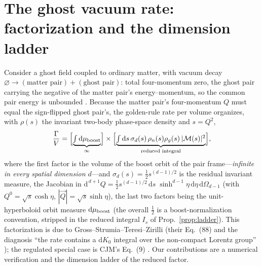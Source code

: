 \documentclass[11pt]{article}
\theoremstyle{definition}
\theoremstyle{remark}
\newcommand{\dd}{\mathrm{d}}
\begin{document}
\section{The ghost vacuum rate: factorization and the dimension
ladder}
\label{sec:factorization}

Consider a ghost field coupled to ordinary matter, with vacuum decay
$\varnothing\to(\text{matter pair})+(\text{ghost pair})$: total
four-momentum zero, the ghost pair carrying the negative of the
matter pair's energy--momentum, so the common pair energy is
unbounded \cite{CHT2003,CJM2004}. Because the matter pair's
four-momentum $Q$ must equal the sign-flipped ghost pair's, the
golden-rule rate per volume organizes, with $\rho(s)$ the invariant
two-body phase-space density and $s=Q^2$,
\begin{equation}
\frac{\Gamma}{V}
=\Bigl[\underbrace{\textstyle\int \dd\mu_{\rm boost}}_{\infty}\Bigr]
\times
\Bigl[\underbrace{\textstyle\int \dd s\,
\sigma_d(s)\,\rho_n(s)\rho_g(s)\,|\mathcal M(s)|^{2}}_{\text{reduced
integral}}\Bigr],
\label{eq:factorization}
\end{equation}
where the first factor is the volume of the boost orbit of the pair
frame---\emph{infinite in every spatial dimension $d$}---and
$\sigma_d(s)=\tfrac12 s^{(d-1)/2}$ is the residual invariant measure,
the Jacobian in
$\dd^{\,d+1}Q=\tfrac12 s^{(d-1)/2}\,\dd s\;\sinh^{d-1}\!\eta\,\dd\eta\,
\dd\Omega_{d-1}$ (with $Q^0=\sqrt s\cosh\eta$,
$|\vec Q|=\sqrt s\sinh\eta$), the last two factors being the
unit-hyperboloid orbit measure $\dd\mu_{\rm boost}$ (the overall
$\tfrac12$ is a boost-normalization convention, stripped in the
reduced integral $I_s$ of Prop.~\ref{prop:ladder}). This factorization
is due to Gross--Strumia--Teresi--Zirilli (their Eq.~(88) and the
diagnosis ``the rate contains a $\dd K_0$ integral over the
non-compact Lorentz group'' \cite{GSTZ2021}); the regulated special
case is CJM's Eq.~(9) \cite{CJM2004}. Our contributions are a
numerical verification and the dimension ladder of the reduced
factor.
\end{document}

